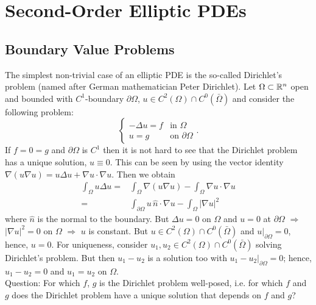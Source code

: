 \documentclass[11pt]{article}
\begin{document}
	

	\section{Second-Order Elliptic PDEs}

		\subsection{Boundary Value Problems}	
	
			The simplest non-trivial case of an elliptic PDE is the so-called Dirichlet's problem (named after German mathematician Peter Dirichlet). Let $\Omega\subset\mathbb{R}^n$ open and bounded with $C^1$-boundary $\partial\Omega$, $u\in C^2(\Omega)\cap C^0(\bar{\Omega})$ and consider the following problem:
				\begin{equation}\label{eq--dirichlet}
					\begin{cases}
						-\Delta u=f & \text{in } \Omega\\
						u=g & \text{on }\partial\Omega
					\end{cases}.\tag{DI}
				\end{equation}
			If $f=0=g$ and $\partial\Omega$ is $C^1$ then it is not hard to see that the Dirichlet problem has a unique solution, $u\equiv0$. This can be seen by using the vector identity $\nabla(u\nabla u)=u\Delta u+\nabla u\cdot\nabla u$. Then we obtain
			\begin{align*}
				\int_\Omega u\Delta u=&\int_\Omega\nabla(u\nabla u)-\int_\Omega \nabla u\cdot\nabla u\\
				=&\int_{\partial\Omega}u\,\hat{n}\cdot\nabla u-\int_\Omega|\nabla u|^2
			\end{align*}
			where $\hat{n}$ is the normal to the boundary.
			But $\Delta u=0$ on $\Omega$ and $u=0$ at $\partial\Omega$ $\Longrightarrow$ $|\nabla u|^2=0$ on $\Omega$ $\Longrightarrow$ $u$ is constant. But $u\in C^2(\Omega)\cap C^0(\bar{\Omega})$ and $u|_{\partial\Omega}=0$, hence, $u=0$. For uniqueness, consider $u_1,u_2\in C^2(\Omega)\cap C^0(\bar{\Omega})$ solving Dirichlet's problem. But then $u_1-u_2$ is a solution too with $u_1-u_2|_{\partial\Omega}=0$; hence, $u_1-u_2=0$ and $u_1=u_2$ on $\Omega$.
			\\

			\noindent Question: For which $f$, $g$ is the Dirichlet problem well-posed, i.e. for which $f$ and $g$ does the Dirichlet problem have a unique solution that  depends on $f$ and $g$?
			\\
\end{document}
